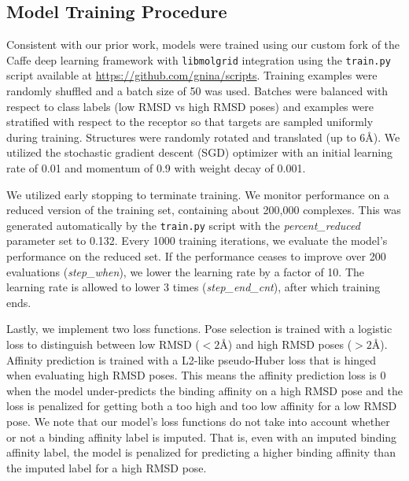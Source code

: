 \documentclass[journal=jcim,manuscript=article]{achemso}
\begin{document}
\subsection{Model Training Procedure}
Consistent with our prior work\cite{crossdocked2020}, models were trained using our custom fork of the Caffe deep learning framework \cite{jia2014caffe} with \texttt{libmolgrid} integration \cite{sunseri2019libmolgrid} using the \texttt{train.py} script available at \url{https://github.com/gnina/scripts}.
Training examples were randomly shuffled and a batch size of 50 was used.
Batches were balanced with respect to class labels (low RMSD vs high RMSD poses) and examples were stratified with respect to the receptor so that targets are sampled uniformly during training.
Structures were randomly rotated and translated (up to 6{\AA}).
We utilized the stochastic gradient descent (SGD) optimizer with an initial learning rate of 0.01 and momentum of 0.9 with weight decay of 0.001.

We utilized early stopping to terminate training.
We monitor performance on a reduced version of the training set, containing about 200,000 complexes.
This was generated automatically by the \texttt{train.py} script with the \textit{percent\_reduced} parameter set to 0.132.
Every 1000 training iterations, we evaluate the model's performance on the reduced set.
If the performance ceases to improve over 200 evaluations (\textit{step\_when}), we lower the learning rate by a factor of 10.
The learning rate is allowed to lower 3 times (\textit{step\_end\_cnt}), after which training ends.

Lastly, we implement two loss functions.
Pose selection is trained with a logistic loss to distinguish between low RMSD ($<2${\AA}) and high RMSD poses ($>2${\AA}).
Affinity prediction is trained with a L2-like pseudo-Huber loss that is hinged when evaluating high RMSD poses.
This means the affinity prediction loss is 0 when the model under-predicts the binding affinity on a high RMSD pose and the loss is penalized for getting both a too high and too low affinity for a low RMSD pose.
We note that our model's loss functions do not take into account whether or not a binding affinity label is imputed.
That is, even with an imputed binding affinity label, the model is penalized for predicting a higher binding affinity than the imputed label for a high RMSD pose.
\end{document}
